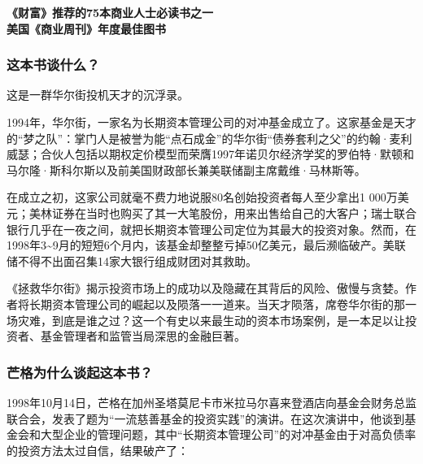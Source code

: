 \cleardoublepage
{}


\begin{BookSummaryBox}
{\centering \textbf{《财富》推荐的75本商业人士必读书之一\\ 美国《商业周刊》年度最佳图书}\par}
\end{BookSummaryBox}

\subsubsection*{这本书谈什么？}

这是一群华尔街投机天才的沉浮录。
\par

1994年，华尔街，一家名为长期资本管理公司的对冲基金成立了。这家基金是天才的“梦之队”：掌门人是被誉为能“点石成金”的华尔街“债券套利之父”的约翰·麦利威瑟；合伙人包括以期权定价模型而荣膺1997年诺贝尔经济学奖的罗伯特·默顿和马尔隆·斯科尔斯以及前美国财政部长兼美联储副主席戴维·马林斯等。
\par

在成立之初，这家公司就毫不费力地说服80名创始投资者每人至少拿出1 000万美元；美林证券在当时也购买了其一大笔股份，用来出售给自己的大客户；瑞士联合银行几乎在一夜之间，就把长期资本管理公司定位为其最大的投资对象。然而，在1998年3\textasciitilde{}9月的短短6个月内，该基金却整整亏掉50亿美元，最后濒临破产。美联储不得不出面召集14家大银行组成财团对其救助。
\par

《拯救华尔街》揭示投资市场上的成功以及隐藏在其背后的风险、傲慢与贪婪。作者将长期资本管理公司的崛起以及陨落一一道来。当天才陨落，席卷华尔街的那一场灾难，到底是谁之过？这一个有史以来最生动的资本市场案例，是一本足以让投资者、基金管理者和监管当局深思的金融巨著。
\par

\subsubsection*{芒格为什么谈起这本书？}

1998年10月14日，芒格在加州圣塔莫尼卡市米拉马尔喜来登酒店向基金会财务总监联合会，发表了题为“一流慈善基金的投资实践”的演讲。在这次演讲中，他谈到基金会和大型企业的管理问题，其中“长期资本管理公司”的对冲基金由于对高负债率的投资方法太过自信，结果破产了：
\par

